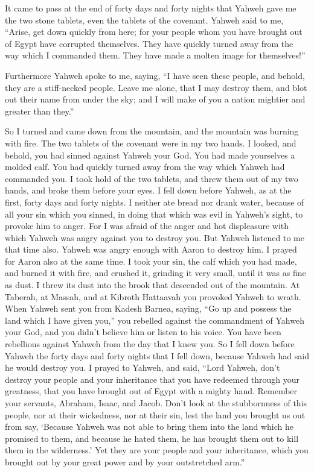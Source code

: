  It came to pass at the end of forty days and forty nights
that Yahweh gave me the two stone tablets, even the tablets of the
covenant.  Yahweh said to me, ``Arise, get down quickly
from here; for your people whom you have brought out of Egypt have
corrupted themselves. They have quickly turned away from the way which I
commanded them. They have made a molten image for themselves!''

 Furthermore Yahweh spoke to me, saying, ``I have seen
these people, and behold, they are a stiff-necked people. 
Leave me alone, that I may destroy them, and blot out their name from
under the sky; and I will make of you a nation mightier and greater than
they.''

 So I turned and came down from the mountain, and the
mountain was burning with fire. The two tablets of the covenant were in
my two hands.  I looked, and behold, you had sinned against
Yahweh your God. You had made yourselves a molded calf. You had quickly
turned away from the way which Yahweh had commanded you.  I
took hold of the two tablets, and threw them out of my two hands, and
broke them before your eyes.  I fell down before Yahweh, as
at the first, forty days and forty nights. I neither ate bread nor drank
water, because of all your sin which you sinned, in doing that which was
evil in Yahweh's sight, to provoke him to anger.  For I was
afraid of the anger and hot displeasure with which Yahweh was angry
against you to destroy you. But Yahweh listened to me that time also.
 Yahweh was angry enough with Aaron to destroy him. I
prayed for Aaron also at the same time.  I took your sin,
the calf which you had made, and burned it with fire, and crushed it,
grinding it very small, until it was as fine as dust. I threw its dust
into the brook that descended out of the mountain.  At
Taberah, at Massah, and at Kibroth Hattaavah you provoked Yahweh to
wrath.  When Yahweh sent you from Kadesh Barnea, saying,
``Go up and possess the land which I have given you,'' you rebelled
against the commandment of Yahweh your God, and you didn't believe him
or listen to his voice.  You have been rebellious against
Yahweh from the day that I knew you.  So I fell down before
Yahweh the forty days and forty nights that I fell down, because Yahweh
had said he would destroy you.  I prayed to Yahweh, and
said, ``Lord Yahweh, don't destroy your people and your inheritance that
you have redeemed through your greatness, that you have brought out of
Egypt with a mighty hand.  Remember your servants, Abraham,
Isaac, and Jacob. Don't look at the stubbornness of this people, nor at
their wickedness, nor at their sin,  lest the land you
brought us out from say, `Because Yahweh was not able to bring them into
the land which he promised to them, and because he hated them, he has
brought them out to kill them in the wilderness.'  Yet they
are your people and your inheritance, which you brought out by your
great power and by your outstretched arm.''

